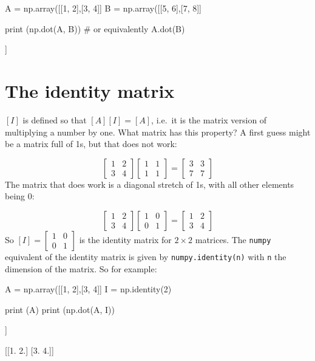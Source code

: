 \begin{ipython}
A = np.array([[1, 2],[3, 4]]
B = np.array([[5, 6],[7, 8]]
	
print (np.dot(A, B))
# or equivalently A.dot(B)
\end{ipython}
\begin{ioutput}
[[19 22]
 [43 50]]
\end{ioutput}

\section{The identity matrix}\label{the-identity-matrix}

\([I]\) is defined so that \([A][I]=[A]\), i.e.~it is the matrix version of multiplying a number by one. What matrix has this property? A first guess might be a matrix full of 1s, but that does not work:

\[
\begin{bmatrix}
1 & 2 \\
3 & 4
\end{bmatrix}
\begin{bmatrix}
1 & 1 \\
1 & 1
\end{bmatrix}
=
\begin{bmatrix}
3 & 3 \\
7 & 7
\end{bmatrix}
\]
The matrix that does work is a diagonal stretch of 1s, with all other elements being 0:

\[
\begin{bmatrix}
1 & 2 \\
3 & 4
\end{bmatrix}
\begin{bmatrix}
1 & 0 \\
0 & 1
\end{bmatrix}
=
\begin{bmatrix}
1 & 2 \\
3 & 4
\end{bmatrix}
\]
So \([I] = 
\begin{bmatrix}
1 & 0 \\
0 & 1
\end{bmatrix}
\) is the identity matrix for \(2\times 2\) matrices. The \texttt{numpy} equivalent of the identity matrix is given by
\texttt{numpy.identity(n)} with \texttt{n} the dimension of the matrix. So for example:

\begin{ipython}
A = np.array([[1, 2],[3, 4]]
I = np.identity(2)	

print (A)
print (np.dot(A, I))
\end{ipython}
\begin{ioutput}
[[1 2]
 [3 4]]

[[1. 2.]
 [3. 4.]]
\end{ioutput}
    
